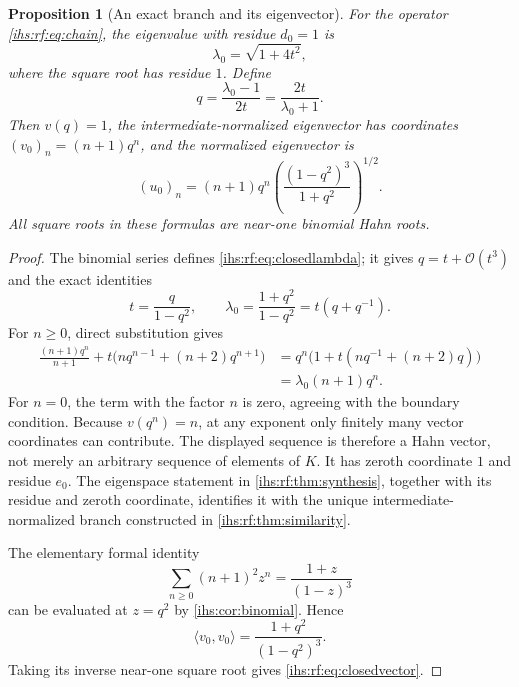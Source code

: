 \documentclass[11pt,a4paper]{article}
\numberwithin{equation}{section}
\newtheorem{proposition}[proposition]{Proposition}
\theoremstyle{definition}
\theoremstyle{remark}
\newcommand{\K}{K}
\newcommand{\bigo}{\mathcal O}
\newcommand{\ip}[2]{\langle#1,#2\rangle}
\begin{document}
\begin{proposition}[An exact branch and its eigenvector]\label{ihs:rf:prop:closed}
For the operator \eqref{ihs:rf:eq:chain}, the eigenvalue with residue
$d_0=1$ is
\begin{equation}\label{ihs:rf:eq:closedlambda}
 \lambda_0=\sqrt{1+4t^2},
\end{equation}
where the square root has residue $1$. Define
\begin{equation}\label{ihs:rf:eq:qdef}
 q=\frac{\lambda_0-1}{2t}=\frac{2t}{\lambda_0+1}.
\end{equation}
Then $v(q)=1$, the intermediate-normalized eigenvector has coordinates
$(v_0)_n=(n+1)q^n$, and the normalized eigenvector is
\begin{equation}\label{ihs:rf:eq:closedvector}
 (u_0)_n=(n+1)q^n\left(\frac{(1-q^2)^3}{1+q^2}\right)^{1/2}.
\end{equation}
All square roots in these formulas are near-one binomial Hahn roots.
\end{proposition}
\begin{proof}
The binomial series defines \eqref{ihs:rf:eq:closedlambda}; it gives
$q=t+\bigo(t^3)$ and the exact identities
\begin{equation}\label{ihs:rf:eq:qrelations}
 t=\frac{q}{1-q^2},\qquad
 \lambda_0=\frac{1+q^2}{1-q^2}=t(q+q^{-1}).
\end{equation}
For $n\ge0$, direct substitution gives
\begin{align*}
 \frac{(n+1)q^n}{n+1}+t\bigl(nq^{n-1}+(n+2)q^{n+1}\bigr)
 &=q^n\bigl(1+t(nq^{-1}+(n+2)q)\bigr)\\
 &=\lambda_0(n+1)q^n.
\end{align*}
For $n=0$, the term with the factor $n$ is zero, agreeing with the boundary
condition. Because $v(q^n)=n$, at any exponent only finitely many vector
coordinates can contribute. The displayed sequence is therefore a Hahn
vector, not merely an arbitrary sequence of elements of $\K$. It has zeroth
coordinate $1$ and residue $e_0$. The eigenspace statement in
\cref{ihs:rf:thm:synthesis}, together with its residue and zeroth
coordinate, identifies it with the unique intermediate-normalized branch
constructed in \cref{ihs:rf:thm:similarity}.

The elementary formal identity
\[
 \sum_{n\ge0}(n+1)^2z^n=\frac{1+z}{(1-z)^3}
\]
can be evaluated at $z=q^2$ by \cref{ihs:cor:binomial}. Hence
\[
 \ip{v_0}{v_0}=\frac{1+q^2}{(1-q^2)^3}.
\]
Taking its inverse near-one square root gives
\eqref{ihs:rf:eq:closedvector}.
\end{proof}
\end{document}
